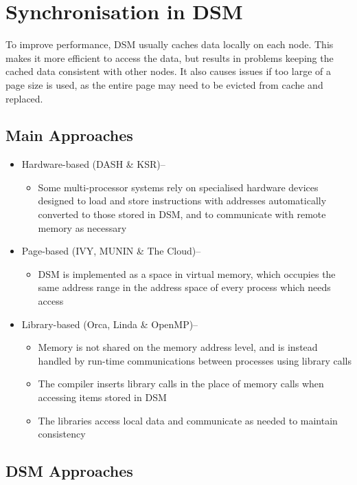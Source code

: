 \section*{Synchronisation in DSM}

To improve performance, DSM usually caches data locally on each node. This makes it more efficient to access the data, but results in problems keeping the cached data consistent with other nodes. It also causes issues if too large of a page size is used, as the entire page may need to be evicted from cache and replaced.

\subsection*{Main Approaches}

\begin{itemize}
  \item Hardware-based (DASH \& KSR)--
  \begin{itemize}
    \item Some multi-processor systems rely on specialised hardware devices designed to load and store instructions with addresses automatically converted to those stored in DSM, and to communicate with remote memory as necessary
  \end{itemize}
  \item Page-based (IVY, MUNIN \& The Cloud)--
  \begin{itemize}
    \item DSM is implemented as a space in virtual memory, which occupies the same address range in the address space of every process which needs access
  \end{itemize}
  \item Library-based (Orca, Linda \& OpenMP)--
  \begin{itemize}
    \item Memory is not shared on the memory address level, and is instead handled by run-time communications between processes using library calls
    \item The compiler inserts library calls in the place of memory calls when accessing items stored in DSM
    \item The libraries access local data and communicate as needed to maintain consistency
  \end{itemize}
\end{itemize}

\subsection*{DSM Approaches}

